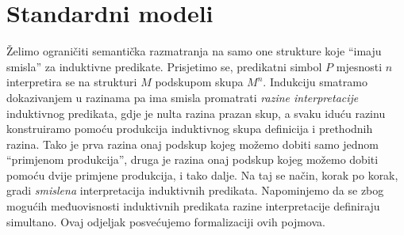 \section{Standardni modeli}\label{sec:standardni-modeli}
Želimo ograničiti semantička razmatranja na samo one strukture koje \enquote{imaju smisla} za induktivne predikate.
Prisjetimo se, predikatni simbol \(P\) mjesnosti \(n\) interpretira se na strukturi \(M\)  podskupom skupa \(M^{n}\).
Indukciju smatramo dokazivanjem \textup{u razinama} pa ima smisla promatrati \textit{razine interpretacije} induktivnog predikata,
gdje je nulta razina prazan skup,
a svaku iduću razinu konstruiramo pomoću produkcija induktivnog skupa definicija i prethodnih razina.
Tako je prva razina onaj podskup kojeg možemo dobiti samo jednom \enquote{primjenom produkcija},
druga je razina onaj podskup kojeg možemo dobiti pomoću dvije primjene produkcija, i tako dalje.
Na taj se način, korak po korak, gradi \textit{smislena} interpretacija induktivnih predikata.
Napominjemo da se zbog mogućih međuovisnosti induktivnih predikata razine interpretacije definiraju simultano.
Ovaj odjeljak posvećujemo formalizaciji ovih pojmova.

